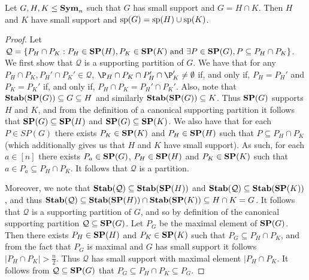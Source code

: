 \documentclass[../paper.tex]{subfiles}
\begin{document}
\begin{lem}
  Let $G, H, K \leq \text{\textbf{Sym}}_n$ such that $G$ has small support and $G = H \cap K$.
  Then $H$ and $K$ have small support and $\text{sp}(G) = \text{sp}(H) \cup
  \text{sp}(K)$.
  \label{lem:row-column-supports-well-behaved}
\end{lem}
\begin{proof}
  Let $\mathcal{Q} = \{P_H \cap P_K : P_H \in \text{\textbf{SP}}(H), P_K \in \text{\textbf{SP}}(K) \text{ and
  } \exists P \in \text{\textbf{SP}}(G), P \subseteq P_H \cap P_K \}$. We first show that
  $\mathcal{Q}$ is a supporting partition of $G$. We have that for any $P_H \cap
  P_K, P_H' \cap P_K' \in \mathcal{Q}$, $\P_H \cap P_K \cap P_H' \cap \P_K' \neq
  \emptyset$ if, and only if, $P_H = P_H'$ and $P_K = P_K'$ if, and only if,
  $P_H \cap P_K = P_H' \cap P_K'$. Also, note that $\text{\textbf{Stab}}(\text{\textbf{SP}}(G)) \subseteq G
  \subseteq H$ and similarly $\text{\textbf{Stab}}(\text{\textbf{SP}}(G)) \subseteq K$. Thus $\text{\textbf{SP}}(G)$ supports
  $H$ and $K$, and from the definition of a canonical supporting partition it
  follows that $\text{\textbf{SP}}(G) \subseteq \text{\textbf{SP}}(H)$ and $\text{\textbf{SP}}(G) \subseteq \text{\textbf{SP}}(K)$. We also
  have that for each $P \in SP(G)$ there exists $P_K \in \text{\textbf{SP}}(K)$ and $P_H \in
  \text{\textbf{SP}}(H)$ such that $P \subseteq P_H \cap P_K$ (which additionally gives us that
  $H$ and $K$ have small support). As such, for each $a \in [n]$ there exists
  $P_a \in \text{\textbf{SP}}(G)$, $P_H \in \text{\textbf{SP}}(H)$ and $P_K \in \text{\textbf{SP}}(K)$ such that $a \in P_a
  \subseteq P_H \cap P_K$. It follows that $\mathcal{Q}$ is a partition.

  Moreover, we note that $\text{\textbf{Stab}}(\mathcal{Q}) \subseteq \text{\textbf{Stab}}(\text{\textbf{SP}}(H))$ and
  $\text{\textbf{Stab}}(\mathcal{Q}) \subseteq \text{\textbf{Stab}}(\text{\textbf{SP}}(K))$, and thus $\text{\textbf{Stab}}(\mathcal{Q})
  \subseteq \text{\textbf{Stab}}(\text{\textbf{SP}}(H)) \cap \text{\textbf{Stab}}(\text{\textbf{SP}}(K)) \subseteq H \cap K = G$. It follows
  that $\mathcal{Q}$ is a supporting partition of $G$, and so by definition of
  the canonical supporting partition $\mathcal{Q} \subseteq \text{\textbf{SP}} (G)$. Let $P_G$
  be the maximal element of $\text{\textbf{SP}}(G)$. Then there exists $P_H \in \text{\textbf{SP}}(H)$ and
  $P_K \in \text{\textbf{SP}}(K)$ such that $P_G \subseteq P_H \cap P_K$, and from the fact
  that $P_G$ is maximal and $G$ has small support it follows $\vert P_H \cap P_K
  \vert > \frac{n}{2}$. Thus $\mathcal{Q}$ has small support with maximal
  element $\vert P_H \cap P_K$. It follows from $\mathcal{Q} \subseteq \text{\textbf{SP}}(G)$
  that $P_G \subseteq P_H \cap P_K \subseteq P_G$.



\end{proof}
\end{document}
